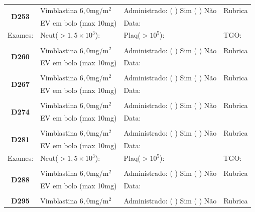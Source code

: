 \documentclass[11pt,a4paper,oldfontcommands]{memoir}
\begin{document}
\begin{center}
\begin{table}[H]
\begin{tabular}{p{}p{}|p{}|p{3cm}}
    \hline
    \multicolumn{1}{c|}{\multirow{2}{*}{\textbf{D253}}}&{Vimblastina \(6,0\)mg/m\(^2\)}&{Administrado: (  ) Sim (  ) Não}&{Rubrica}\\
    \multicolumn{1}{c|}{}&{EV em bolo (max 10mg)}&{Data:}&\\
    \hline
    {Exames:}&{Neut(\(>1,5\times10^3\)):}&{Plaq(\(>10^5\)):}&{TGO:}
    \\
    \hline
    \\
    \hline
    \multicolumn{1}{c|}{\multirow{2}{*}{\textbf{D260}}}&{Vimblastina \(6,0\)mg/m\(^2\)}&{Administrado: (  ) Sim (  ) Não}&{Rubrica}\\
    \multicolumn{1}{c|}{}&{EV em bolo (max 10mg)}&{Data:}&\\
    \hline
    \\
    \hline
    \multicolumn{1}{c|}{\multirow{2}{*}{\textbf{D267}}}&{Vimblastina \(6,0\)mg/m\(^2\)}&{Administrado: (  ) Sim (  ) Não}&{Rubrica}\\
    \multicolumn{1}{c|}{}&{EV em bolo (max 10mg)}&{Data:}&\\
    \hline
    \\
    \hline
    \multicolumn{1}{c|}{\multirow{2}{*}{\textbf{D274}}}&{Vimblastina \(6,0\)mg/m\(^2\)}&{Administrado: (  ) Sim (  ) Não}&{Rubrica}\\
    \multicolumn{1}{c|}{}&{EV em bolo (max 10mg)}&{Data:}&\\
    \hline
    \\
    \hline
    \multicolumn{1}{c|}{\multirow{2}{*}{\textbf{D281}}}&{Vimblastina \(6,0\)mg/m\(^2\)}&{Administrado: (  ) Sim (  ) Não}&{Rubrica}\\
    \multicolumn{1}{c|}{}&{EV em bolo (max 10mg)}&{Data:}&\\
    \hline
    {Exames:}&{Neut(\(>1,5\times10^3\)):}&{Plaq(\(>10^5\)):}&{TGO:}
    \\
    \hline
    \\
    \hline
    \multicolumn{1}{c|}{\multirow{2}{*}{\textbf{D288}}}&{Vimblastina \(6,0\)mg/m\(^2\)}&{Administrado: (  ) Sim (  ) Não}&{Rubrica}\\
    \multicolumn{1}{c|}{}&{EV em bolo (max 10mg)}&{Data:}&\\
    \hline
    \\
    \hline
    \multicolumn{1}{c|}{\multirow{2}{*}{\textbf{D295}}}&{Vimblastina \(6,0\)mg/m\(^2\)}&{Administrado: (  ) Sim (  ) Não}&{Rubrica}\\

\end{tabular}
\end{table}
\end{center}
\end{document}
